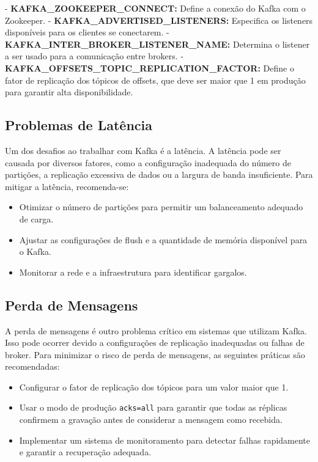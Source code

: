 - \textbf{KAFKA\_ZOOKEEPER\_CONNECT:} Define a conexão do Kafka com o Zookeeper.
- \textbf{KAFKA\_ADVERTISED\_LISTENERS:} Especifica os listeners disponíveis para os clientes se conectarem.
- \textbf{KAFKA\_INTER\_BROKER\_LISTENER\_NAME:} Determina o listener a ser usado para a comunicação entre brokers.
- \textbf{KAFKA\_OFFSETS\_TOPIC\_REPLICATION\_FACTOR:} Define o fator de replicação dos tópicos de offsets, que deve ser maior que 1 em produção para garantir alta disponibilidade.

\subsection{Problemas de Latência}
Um dos desafios ao trabalhar com Kafka é a latência. A latência pode ser causada por diversos fatores, como a configuração inadequada do número de partições, a replicação excessiva de dados ou a largura de banda insuficiente. Para mitigar a latência, recomenda-se:

\begin{itemize}
    \item Otimizar o número de partições para permitir um balanceamento adequado de carga.
    \item Ajustar as configurações de flush e a quantidade de memória disponível para o Kafka.
    \item Monitorar a rede e a infraestrutura para identificar gargalos.
\end{itemize}

\subsection{Perda de Mensagens}
A perda de mensagens é outro problema crítico em sistemas que utilizam Kafka. Isso pode ocorrer devido a configurações de replicação inadequadas ou falhas de broker. Para minimizar o risco de perda de mensagens, as seguintes práticas são recomendadas:

\begin{itemize}
    \item Configurar o fator de replicação dos tópicos para um valor maior que 1.
    \item Usar o modo de produção \texttt{acks=all} para garantir que todas as réplicas confirmem a gravação antes de considerar a mensagem como recebida.
    \item Implementar um sistema de monitoramento para detectar falhas rapidamente e garantir a recuperação adequada.
\end{itemize}

